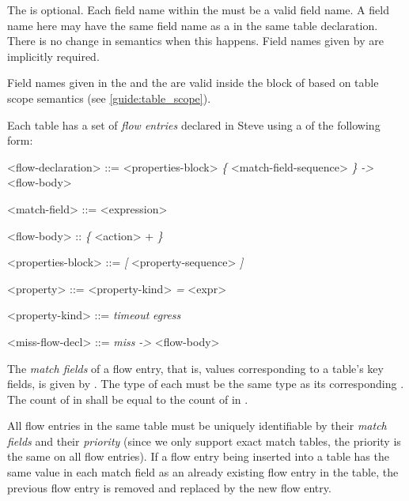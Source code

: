The  is optional. Each field name within the  must be a valid field name. A field name here may have the same field name as a  in the same table declaration. There is no change in semantics when this happens. Field names given by  are implicitly required.

Field names given in the  and the  are valid inside the block of  based on table scope semantics (see \ref{guide:table_scope}).

Each table has a set of \textit{flow entries} declared in Steve using a  of the following form:

\begin{minip}
\begin{grammar}
<flow-declaration> ::=
<properties-block>
\textit{\{} <match-field-sequence> \textit{\}} \textit{-\textgreater} <flow-body>

<match-field> ::= <expression>

<flow-body> :: \textit{\{} <action> + \textit{\}}

<properties-block> ::=
\textit{[} <property-sequence> \textit{]}

<property> ::=
<property-kind> \textit{=} <expr>

<property-kind> ::=
\textit{timeout}
\alt \textit{egress}

<miss-flow-decl> ::=
\textit{miss} \textit{-\textgreater} <flow-body>
\end{grammar}
\end{minip}

The \textit{match fields} of a flow entry, that is, values corresponding to a table's key fields, is given by . The type of each  must be the same type as its corresponding . The count of  in  shall be equal to the count of  in .

All flow entries in the same table must be uniquely identifiable by their \textit{match fields} and their \textit{priority} (since we only support exact match tables, the priority is the same on all flow entries). If a flow entry being inserted into a table has the same value in each match field as an already existing flow entry in the table, the previous flow entry is removed and replaced by the new flow entry.

